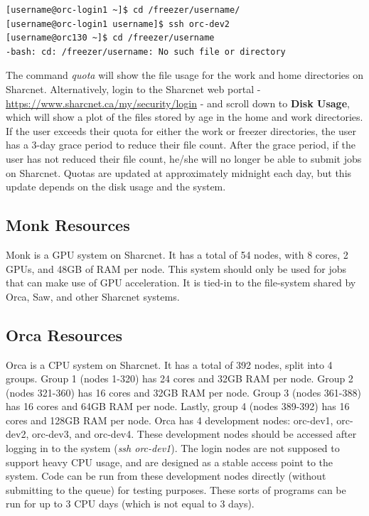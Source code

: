 \documentclass[12pt]{article}
\begin{document}
\begin{lstlisting}[numbers=none]
[username@orc-login1 ~]$ cd /freezer/username/
[username@orc-login1 username]$ ssh orc-dev2
[username@orc130 ~]$ cd /freezer/username
-bash: cd: /freezer/username: No such file or directory

\end{lstlisting}
\quad The command \textit{quota} will show the file usage for the work and home directories on Sharcnet. Alternatively, login to the Sharcnet web portal - \url{https://www.sharcnet.ca/my/security/login} - and scroll down to \textbf{Disk Usage}, which will show a plot of the files stored by age in the home and work directories. If the user exceeds their quota for either the work or freezer directories, the user has a 3-day grace period to reduce their file count. After the grace period, if the user has not reduced their file count, he/she will no longer be able to submit jobs on Sharcnet. Quotas are updated at approximately midnight each day, but this update depends on the disk usage and the system.

\subsection{Monk Resources}
\quad Monk is a GPU system on Sharcnet. It has a total of 54 nodes, with 8 cores, 2 GPUs, and 48GB of RAM per node. This system should only be used for jobs that can make use of GPU acceleration. It is tied-in to the file-system shared by Orca, Saw, and other Sharcnet systems.

\subsection{Orca Resources}

\quad Orca is a CPU system on Sharcnet. It has a total of 392 nodes, split into 4 groups. Group 1 (nodes 1-320) has 24 cores and 32GB RAM per node. Group 2 (nodes 321-360) has 16 cores and 32GB RAM per node. Group 3 (nodes 361-388) has 16 cores and 64GB RAM per node. Lastly, group 4 (nodes 389-392) has 16 cores and 128GB RAM per node. Orca has 4 development nodes: orc-dev1, orc-dev2, orc-dev3, and orc-dev4. These development nodes should be accessed after logging in to the system (\textit{ssh orc-dev1}). The login nodes are not supposed to support heavy CPU usage, and are designed as a stable access point to the system. Code can be run from these development nodes directly (without submitting to the queue) for testing purposes. These sorts of programs can be run for up to 3 CPU days (which is not equal to 3 days). 
\end{document}
